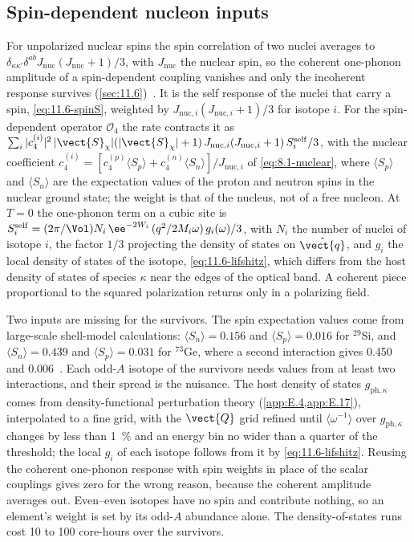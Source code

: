 \subsection{Spin-dependent nucleon inputs}

For unpolarized nuclear spins the spin correlation of two nuclei averages to $\delta_{\kappa\kappa'}\delta^{ab}J_{\mathrm{nuc}}(J_{\mathrm{nuc}} + 1)/3$, with $J_{\mathrm{nuc}}$ the nuclear spin, so the coherent one-phonon amplitude of a spin-dependent coupling vanishes and only the incoherent response survives (\cref{sec:11.6})~\cite{bloch2025broadband}. It is the self response of the nuclei that carry a spin, \cref{eq:11.6-spinS}, weighted by $J_{\mathrm{nuc},i}(J_{\mathrm{nuc},i} + 1)/3$ for isotope $i$. For the spin-dependent operator $\mathcal{O}_4$ the rate contracts it as $\sum_i|c_4^{(i)}|^2\,|\vect{S}_\chi|(|\vect{S}_\chi| + 1)\,J_{\mathrm{nuc},i}(J_{\mathrm{nuc},i} + 1)\,S^{\mathrm{self}}_i/3$, with the nuclear coefficient $c_4^{(i)} = [c_4^{(p)}\langle S_p\rangle + c_4^{(n)}\langle S_n\rangle]/J_{\mathrm{nuc},i}$ of \cref{eq:8.1-nuclear}, where $\langle S_p\rangle$ and $\langle S_n\rangle$ are the expectation values of the proton and neutron spins in the nuclear ground state; the weight is that of the nucleus, not of a free nucleon. At $T = 0$ the one-phonon term on a cubic site is $S^{\mathrm{self}}_i = (2\pi/\Vol)N_i\,\ee^{-2W_i}\,(q^2/2M_i\omega)\,g_i(\omega)/3$, with $N_i$ the number of nuclei of isotope $i$, the factor $1/3$ projecting the density of states on $\hat{\vect{q}}$, and $g_i$ the local density of states of the isotope, \cref{eq:11.6-lifshitz}, which differs from the host density of states of species $\kappa$ near the edges of the optical band. A coherent piece proportional to the squared polarization returns only in a polarizing field.

Two inputs are missing for the survivors. The spin expectation values come from large-scale shell-model calculations: $\langle S_n\rangle = 0.156$ and $\langle S_p\rangle = 0.016$ for $^{29}$Si, and $\langle S_n\rangle = 0.439$ and $\langle S_p\rangle = 0.031$ for $^{73}$Ge, where a second interaction gives 0.450 and 0.006~\cite[Table~III]{klos2013large}. Each odd-$A$ isotope of the survivors needs values from at least two interactions, and their spread is the nuisance. The host density of states $g_{\mathrm{ph},\kappa}$ comes from density-functional perturbation theory (\cref{app:E.4,app:E.17}), interpolated to a fine grid, with the $\vect{Q}$ grid refined until $\langle\omega^{-1}\rangle$ over $g_{\mathrm{ph},\kappa}$ changes by less than \SI{1}{\percent} and an energy bin no wider than a quarter of the threshold; the local $g_i$ of each isotope follows from it by \cref{eq:11.6-lifshitz}. Reusing the coherent one-phonon response with spin weights in place of the scalar couplings gives zero for the wrong reason, because the coherent amplitude averages out. Even--even isotopes have no spin and contribute nothing, so an element's weight is set by its odd-$A$ abundance alone. The density-of-states runs cost 10 to 100 core-hours over the survivors.
